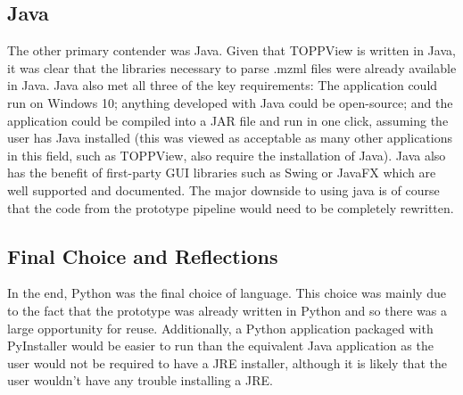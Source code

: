 \documentclass{l4proj}
\begin{document}
\subsection{Java}
The other primary contender was Java. Given that TOPPView is written in Java, it was clear that the libraries necessary to parse .mzml files were already available in Java. Java also met all three of the key requirements: The application could run on Windows 10; anything developed with Java could be open-source; and the application could be compiled into a JAR file and run in one click, assuming the user has Java installed (this was viewed as acceptable as many other applications in this field, such as TOPPView, also require the installation of Java). Java also has the benefit of first-party GUI libraries such as Swing or JavaFX which are well supported and documented. The major downside to using java is of course that the code from the prototype pipeline would need to be completely rewritten.

\subsection{Final Choice and Reflections}
In the end, Python was the final choice of language. This choice was mainly due to the fact that the prototype was already written in Python and so there was a large opportunity for reuse. Additionally, a Python application packaged with PyInstaller would be easier to run than the equivalent Java application as the user would not be required to have a JRE installer, although it is likely that the user wouldn't have any trouble installing a JRE.
\end{document}
